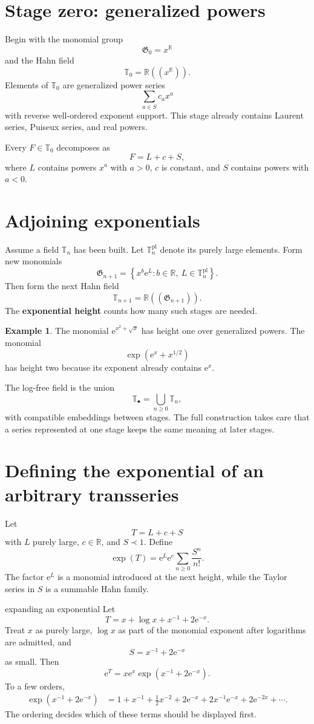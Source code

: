 \documentclass[11pt,openany]{book}
\theoremstyle{plain}
\theoremstyle{definition}
\newtheorem{example}[theorem]{Example}
\theoremstyle{remark}
\newcommand{\R}{\mathbb{R}}
\newcommand{\Tfield}{\mathbb{T}}
\newcommand{\G}{\mathfrak{G}}
\newcommand{\e}{\mathrm{e}}
\newcommand{\set}[1]{\left\{#1\right\}}
\newcommand{\defterm}[1]{\textbf{#1}}
\begin{document}
\section{Stage zero: generalized powers}
Begin with the monomial group
\[
  \G_0=x^\R
\]
and the Hahn field
\[
  \Tfield_0=\R((x^\R)).
\]
Elements of $\Tfield_0$ are generalized power series
\[
  \sum_{a\in S}c_a x^a
\]
with reverse well-ordered exponent support. This stage already contains Laurent series, Puiseux series, and real powers.

Every $F\in\Tfield_0$ decomposes as
\[
  F=L+c+S,
\]
where $L$ contains powers $x^a$ with $a>0$, $c$ is constant, and $S$ contains powers with $a<0$.

\section{Adjoining exponentials}
Assume a field $\Tfield_n$ has been built. Let $\Tfield_n^{\mathrm{pl}}$ denote its purely large elements. Form new monomials
\[
  \G_{n+1}
  =\set{x^b\e^L:b\in\R,\ L\in\Tfield_n^{\mathrm{pl}}}.
\]
Then form the next Hahn field
\[
  \Tfield_{n+1}=\R((\G_{n+1})).
\]
The \defterm{exponential height} counts how many such stages are needed.

\begin{example}
The monomial $\e^{x^2+\sqrt{x}}$ has height one over generalized powers. The monomial
\[
  \exp\!\left(\e^x+x^{1/2}\right)
\]
has height two because its exponent already contains $\e^x$.
\end{example}

The log-free field is the union
\[
  \Tfield_{\bullet}=\bigcup_{n\ge0}\Tfield_n,
\]
with compatible embeddings between stages. The full construction takes care that a series represented at one stage keeps the same meaning at later stages.

\section{Defining the exponential of an arbitrary transseries}
Let
\[
  T=L+c+S
\]
with $L$ purely large, $c\in\R$, and $S\prec1$. Define
\[
  \exp(T)=\e^L\e^c\sum_{n\ge0}\frac{S^n}{n!}.
\]
The factor $\e^L$ is a monomial introduced at the next height, while the Taylor series in $S$ is a summable Hahn family.

\begin{workedbox}{expanding an exponential}
Let
\[
  T=x+\log x+x^{-1}+2\e^{-x}.
\]
Treat $x$ as purely large, $\log x$ as part of the monomial exponent after logarithms are admitted, and
\[
  S=x^{-1}+2\e^{-x}
\]
as small. Then
\[
  \e^T=x\e^x\exp(x^{-1}+2\e^{-x}).
\]
To a few orders,
\begin{align*}
  \exp(x^{-1}+2\e^{-x})
  &=1+x^{-1}+\frac{1}{2}x^{-2}
    +2\e^{-x}+2x^{-1}\e^{-x}+2\e^{-2x}+\cdots.
\end{align*}
The ordering decides which of these terms should be displayed first.
\end{workedbox}
\end{document}
